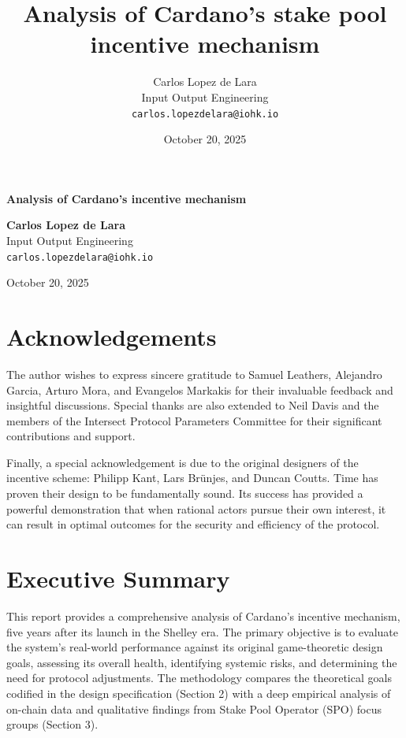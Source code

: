 \documentclass[11pt, letterpaper]{article}
\title{Analysis of Cardano's stake pool incentive mechanism}
\author{
    Carlos Lopez de Lara \\
    Input Output Engineering \\
    \texttt{carlos.lopezdelara@iohk.io}
}
\date{October 20, 2025}
\begin{document}
\begin{titlepage}
    \centering %
    
    \vfill %
    
    {\Huge \textbf{Analysis of Cardano's incentive mechanism}}
    
    \vfill 
    
    {
        \Large \textbf{Carlos Lopez de Lara} \\
        \vspace{1em} 
        \large Input Output Engineering \\
        \large \texttt{carlos.lopezdelara@iohk.io}
    }
    
    \vfill
    
    {\large October 20, 2025}
    
    \vfill 
\end{titlepage}

\thispagestyle{empty} 

\tableofcontents
\newpage
\pagestyle{fancy} 

\newpage

\section*{Acknowledgements}

The author wishes to express sincere gratitude to Samuel Leathers, Alejandro Garcia, 
Arturo Mora, and Evangelos Markakis for their invaluable feedback and insightful 
discussions. Special thanks are also extended to Neil Davis and the members of 
the Intersect Protocol Parameters Committee for their significant contributions and support.

Finally, a special acknowledgement is due to the original designers of the incentive scheme: 
Philipp Kant, Lars Br\"unjes, and Duncan Coutts. Time has proven their design to be 
fundamentally sound. Its success has provided a powerful demonstration that when 
rational actors pursue their own interest, it can result in optimal 
outcomes for the security and efficiency of the protocol.

\newpage


\section*{Executive Summary}

This report provides a comprehensive analysis of Cardano's incentive mechanism, five years after its 
launch in the Shelley era. The primary objective is to evaluate the system's real-world performance 
against its original game-theoretic design goals, assessing its overall health, identifying systemic 
risks, and determining the need for protocol adjustments. The methodology compares the theoretical goals 
codified in the design specification (Section 2) with a deep empirical analysis of on-chain data and 
qualitative findings from Stake Pool Operator (SPO) focus groups (Section 3).
\end{document}
